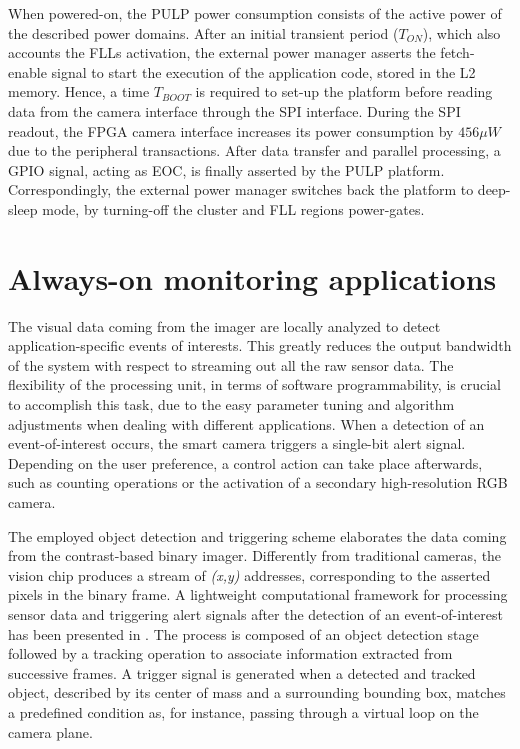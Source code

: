 \documentclass[journal]{IEEEtran}
\begin{document}
When powered-on, the PULP power consumption consists of the active power of the described power domains.
After an initial transient period ($T_{ON}$), which also accounts the FLLs activation, the external power manager asserts the fetch-enable signal to start the execution of the application code, stored in the L2 memory. Hence, a time $T_{BOOT}$ is required to set-up the platform before reading data from the camera interface through the SPI interface. During the SPI readout, the FPGA camera interface increases its power consumption by $456\mu W$ due to the peripheral transactions. 
After data transfer and parallel processing, a GPIO signal, acting as EOC, is finally asserted by the PULP platform. Correspondingly,
the external power manager switches back the platform to deep-sleep mode, by turning-off the cluster and FLL regions power-gates.



\section{Always-on monitoring applications}
\label{sec:App}

The visual data coming from the imager are locally analyzed to detect application-specific events of interests. This greatly reduces the output bandwidth of the system with respect to streaming out all the raw sensor data. The flexibility of the processing unit, in terms of software programmability, is crucial to accomplish this task, due to the easy parameter tuning and algorithm adjustments when dealing with different applications. When a detection of an event-of-interest occurs, the smart camera triggers a single-bit alert signal. Depending on the user preference, a control action can take place afterwards, such as counting operations or the activation of a secondary high-resolution RGB camera.

The employed object detection and triggering scheme elaborates the data coming from the contrast-based binary imager. Differently from traditional cameras, the vision chip produces a stream of \textit{(x,y)} addresses, corresponding to the asserted pixels in the binary frame. A lightweight computational framework for processing sensor data and triggering alert signals after the detection of an event-of-interest has been presented in \cite{RusciISC2}. The process is composed of an object detection stage followed by a tracking operation to associate information extracted from successive frames. A trigger signal is generated when a detected and tracked object, described by its center of mass and a surrounding bounding box, matches a predefined condition as, for instance, passing through a virtual loop on the camera plane. 
\end{document}
